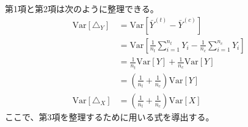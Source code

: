 第1項と第2項は次のように整理できる。
\begin{align}
    \text{Var}[\triangle_{Y}] & = \text{Var}[\bar{Y}^{(t)} - \bar{Y}^{(c)}]                                                                  \\
                              & = \text{Var}\left[\frac{1}{n_{t}}\sum_{i = 1}^{n_{t}}Y_{i} - \frac{1}{n_{c}}\sum_{i = 1}^{n_{c}}Y_{i}\right] \\
                              & = \frac{1}{n_{t}}\text{Var}[Y] + \frac{1}{n_{c}}\text{Var}[Y]                                                \\
                              & = \left(\frac{1}{n_{t}} + \frac{1}{n_{c}}\right)\text{Var}[Y]                                                \\
    \text{Var}[\triangle_{X}] & = \left(\frac{1}{n_{t}} + \frac{1}{n_{c}}\right)\text{Var}[X]
\end{align}
ここで、第3項を整理するために用いる式を導出する。
